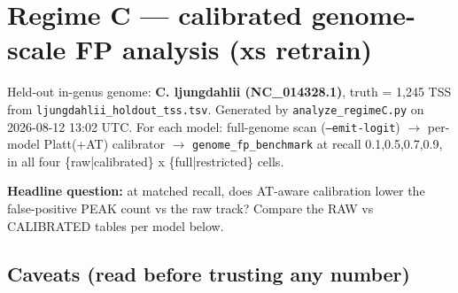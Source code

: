 \documentclass[10pt]{article}
\begin{document}
\section*{Regime C --- calibrated genome-scale FP analysis (xs retrain)}

Held-out in-genus genome: \textbf{C. ljungdahlii (NC\_014328.1)}, truth = 1,245 TSS from \texttt{ljungdahlii\_holdout\_tss.tsv}.
Generated by \texttt{analyze\_regimeC.py} on 2026-08-12 13:02 UTC.
For each model: full-genome scan (\texttt{--emit-logit}) $\to$ per-model Platt(+AT) calibrator $\to$ \texttt{genome\_fp\_benchmark} at recall 0.1,0.5,0.7,0.9, in all four \{raw|calibrated\} x \{full|restricted\} cells.

\textbf{Headline question:} at matched recall, does AT-aware calibration lower the false-positive PEAK count vs the raw track? Compare the RAW vs CALIBRATED tables per model below.


\subsection*{Caveats (read before trusting any number)}
\end{document}
